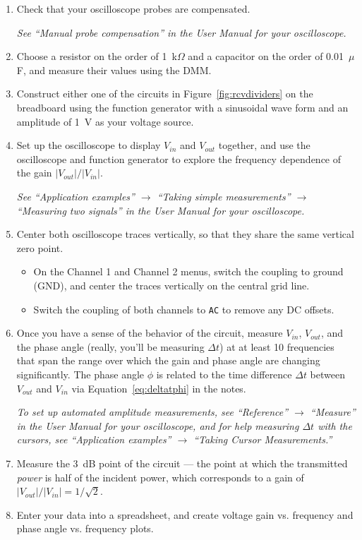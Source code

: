 \documentclass[11pt]{article}
\begin{document}
\begin{enumerate}
\item Check that your oscilloscope probes are compensated.

  \emph{See ``Manual probe compensation'' in the User Manual for
    your oscilloscope.}

\item Choose a resistor on the order of 1~k$\Omega$ and a capacitor on
  the order of 0.01~$\mu$F, and measure their values using the DMM.  

\item Construct either one of the circuits in
  Figure~\ref{fig:rcvdividers} on the breadboard using the function
  generator with a sinusoidal wave form and an amplitude of 1~V as
  your voltage source.

\item Set up the oscilloscope to display $V_{in}$ and $V_{out}$
  together, and use the oscilloscope and function generator to explore
  the frequency dependence of the gain $|V_{out}|/|V_{in}|$. 

  \emph{See ``Application examples'' $\rightarrow$ ``Taking simple
    measurements'' $\rightarrow$ ``Measuring two signals'' in the
    User Manual for your oscilloscope.}

\item Center both oscilloscope traces vertically, so that they share
  the same vertical zero point.
  \begin{itemize}
  \item On the Channel 1 and Channel 2 menus, switch the coupling to
    ground (GND), and center the traces vertically on the central grid
    line.
  \item Switch the coupling of both channels to \texttt{AC} to remove
    any DC offsets.
  \end{itemize}
  
\item Once you have a sense of the behavior of the circuit, measure
  $V_{in}$, $V_{out}$, and the phase angle (really, you'll be
  measuring $\Delta t$) at at least 10 frequencies that span the range
  over which the gain and phase angle are changing significantly.
  The phase angle $\phi$ is related to the time difference $\Delta t$
  between $V_{out}$ and $V_{in}$ via Equation~\ref{eq:deltatphi} in
  the notes. 

  \emph{To set up automated amplitude measurements, see ``Reference''
    $\rightarrow$ ``Measure'' in the User Manual for your
    oscilloscope, and for help measuring $\Delta t$ with the cursors,
    see ``Application examples'' $\rightarrow$ ``Taking Cursor
    Measurements.''}

\item Measure the 3~dB point of the circuit --- the point at
  which the transmitted \emph{power} is half of the
  incident power, which corresponds to a gain of $|V_{out}|/|V_{in}| =
  1/\sqrt{2}$.

\item Enter your data into a spreadsheet, and create voltage gain
  vs. frequency and phase angle vs. frequency plots.
\end{enumerate}
\end{document}
